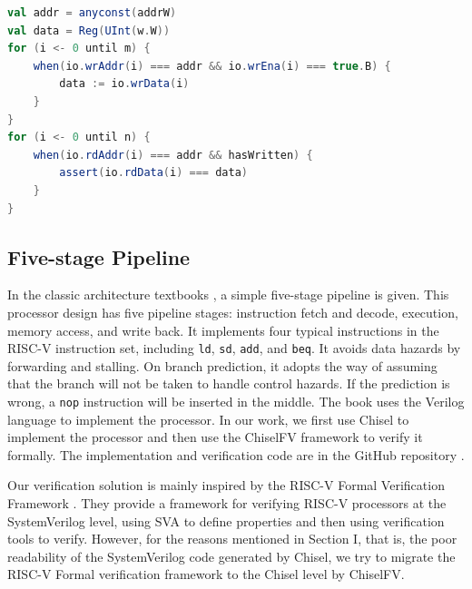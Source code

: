 \documentclass[conference]{IEEEtran}
\theoremstyle{definition}
\begin{document}
\begin{lstlisting}[language=scala, caption={Verification Code of Multi-ported Memory Module}, label=memassert]
val addr = anyconst(addrW)
val data = Reg(UInt(w.W))
for (i <- 0 until m) {
    when(io.wrAddr(i) === addr && io.wrEna(i) === true.B) {
        data := io.wrData(i)
    }
}
for (i <- 0 until n) {
    when(io.rdAddr(i) === addr && hasWritten) {
        assert(io.rdData(i) === data)
    }
}
\end{lstlisting}

\subsection{Five-stage Pipeline}
In the classic architecture textbooks \cite{patterson2017computer}, a simple five-stage pipeline is given. 
This processor design has five pipeline stages: instruction fetch and decode, execution, memory access, and write back. 
It implements four typical instructions in the RISC-V instruction set, including \verb|ld|, \verb|sd|, \verb|add|, and \verb|beq|.
It avoids data hazards by forwarding and stalling. On branch prediction, it adopts the way of assuming that the branch will not be taken to handle control hazards. If the prediction is wrong, a \verb|nop| instruction will be inserted in the middle.
The book uses the Verilog language to implement the processor. In our work, we first use Chisel to implement the processor and then use the ChiselFV framework to verify it formally. The implementation and verification code are in the GitHub repository \cite{riscvFvChisel}.

Our verification solution is mainly inspired by the RISC-V Formal Verification Framework \cite{riscv-formal}. They provide a framework for verifying RISC-V processors at the SystemVerilog level, using SVA to define properties and then using verification tools to verify.
However, for the reasons mentioned in Section I, that is, the poor readability of the SystemVerilog code generated by Chisel, 
we try to migrate the RISC-V Formal verification framework to the Chisel level by ChiselFV.
\end{document}

